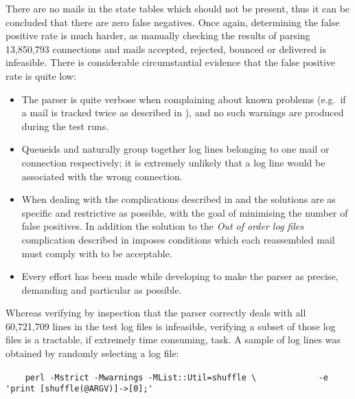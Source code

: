 There are no mails in the state tables which should not be present, thus it
can be concluded that there are zero false negatives.  Once again,
determining the false positive rate is much harder, as manually checking
the results of parsing 13,850,793 connections and mails accepted, rejected,
bounced or delivered is infeasible.  There is considerable circumstantial
evidence that the false positive rate is quite low:

\begin{itemize}

    \item The parser is quite verbose when complaining about known problems
        (e.g.\ if a mail is tracked twice as described in
        ), and no such warnings are
        produced during the test runs.

    \item Queueids and \pids{} naturally group together log lines belonging
        to one mail or connection respectively; it is extremely unlikely
        that a log line would be associated with the wrong connection.

    \item When dealing with the complications described in
         and  the solutions are as specific and restrictive as
        possible, with the goal of minimising the number of false
        positives.  In addition the solution to the \textit{Out of order
        log files\/} complication described in  imposes conditions which each reassembled mail must comply
        with to be acceptable.

    \item Every effort has been made while developing to make the parser as
        precise, demanding and particular as possible.

\end{itemize}

Whereas verifying by inspection that the parser correctly deals with all
60,721,709 lines in the test log files is infeasible, verifying a subset of
those log files is a tractable, if extremely time consuming, task.  A
sample of log lines was obtained by randomly selecting a log file:

\verb!    perl -Mstrict -Mwarnings -MList::Util=shuffle \!\newline
\verb!            -e 'print [shuffle(@ARGV)]->[0];'!

